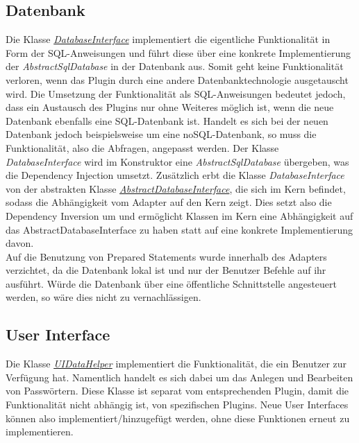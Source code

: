 \subsection{Datenbank}
Die Klasse \href{https://github.com/moorts/Morik/blob/main/src/adapters/database/DatabaseInterface.h}{\textit{DatabaseInterface}} implementiert die eigentliche Funktionalität in Form der SQL-Anweisungen und führt diese über eine konkrete Implementierung der \textit{AbstractSqlDatabase} in der Datenbank aus. Somit geht keine Funktionalität verloren, wenn das Plugin durch eine andere Datenbanktechnologie ausgetauscht wird. Die Umsetzung der Funktionalität als SQL-Anweisungen bedeutet jedoch, dass ein Austausch des Plugins nur ohne Weiteres möglich ist, wenn die neue Datenbank ebenfalls eine SQL-Datenbank ist. Handelt es sich bei der neuen Datenbank jedoch beispielsweise um eine noSQL-Datenbank, so muss die Funktionalität, also die Abfragen, angepasst werden. Der Klasse \textit{DatabaseInterface} wird im Konstruktor eine \textit{AbstractSqlDatabase} übergeben, was die Dependency Injection umsetzt. Zusätzlich erbt die Klasse \textit{DatabaseInterface} von der abstrakten Klasse \href{https://github.com/moorts/Morik/blob/main/src/application/AbstractDatabaseInterface.h}{\textit{AbstractDatabaseInterface}}, die sich im Kern befindet, sodass die Abhängigkeit vom Adapter auf den Kern zeigt. Dies setzt also die Dependency Inversion um und ermöglicht Klassen im Kern eine Abhängigkeit auf das AbstractDatabaseInterface zu haben statt auf eine konkrete Implementierung davon.\\
Auf die Benutzung von Prepared Statements wurde innerhalb des Adapters verzichtet, da die Datenbank lokal ist und nur der Benutzer Befehle auf ihr ausführt. Würde die Datenbank über eine öffentliche Schnittstelle angesteuert werden, so wäre dies nicht zu vernachlässigen.

\subsection{User Interface}

Die Klasse \href{https://github.com/moorts/Morik/blob/user_interface/src/adapters/ui/UiDataHelper.h}{\textit{UIDataHelper}} implementiert die Funktionalität, die ein Benutzer zur Verfügung hat. Namentlich handelt es sich dabei um das Anlegen und Bearbeiten von Passwörtern. Diese Klasse ist separat vom entsprechenden Plugin, damit die Funktionalität nicht abhängig ist, von spezifischen Plugins. Neue User Interfaces können also implementiert/hinzugefügt werden, ohne diese Funktionen erneut zu implementieren.

